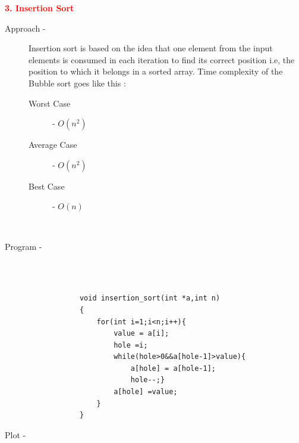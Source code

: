 \documentclass[0pt]{article}
\begin{document}
	
	
	
	
	
	
	
	
	
	
	
	
	
	
	
	
	
	
	
	
	
	
	
	
	
	
	
	\begin{flushleft}
		\textbf{\textcolor{red}{3. Insertion Sort}}
		\leavevmode \\
		\begin{description}
			\item[Approach - ] Insertion sort is based on the idea that one element from the input elements is consumed in each iteration to find its correct position i.e, the position to which it belongs in a sorted array. Time complexity of the Bubble sort goes like this :  
			\leavevmode \\
			\begin{description}
				\item[Worst Case] - \(O(n^2)\)
				\item[Average Case] - \(O(n^2)\)
				\item[Best Case] - \(O(n)\)
			\end{description}
			\leavevmode \\
			\item[Program - ] \leavevmode \\
			\leavevmode \\
			\begin{lstlisting}
			void insertion_sort(int *a,int n)
			{
				for(int i=1;i<n;i++){
					value = a[i];
					hole =i;
					while(hole>0&&a[hole-1]>value){
						a[hole] = a[hole-1];
						hole--;}
					a[hole] =value;
				}
			}
			\end{lstlisting}
			\item[Plot - ] \leavevmode \\
		\end{description}
	\end{flushleft}
	\begin{center}
	\end{center}
	\leavevmode \\
	
\end{document}

